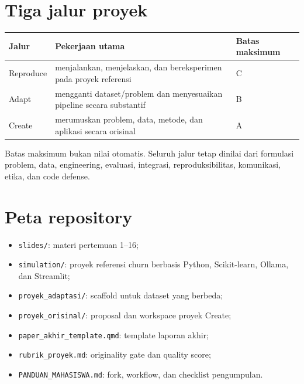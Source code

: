 \documentclass[
  indonesian,
  letterpaper,
  DIV=11,
  numbers=noendperiod]{scrreprt}
\newcounter{none} %
\providecommand{\tightlist}{%
  \setlength{\itemsep}{0pt}\setlength{\parskip}{0pt}}
\begin{document}
\section{Tiga jalur proyek}\label{tiga-jalur-proyek}

{\def\LTcaptype{none} %
\begin{longtable}[]{@{}
  >{\raggedright\arraybackslash}p{}
  >{\raggedright\arraybackslash}p{}
  >{\raggedleft\arraybackslash}p{}@{}}
\toprule\noalign{}
\begin{minipage}[b]{\linewidth}\raggedright
Jalur
\end{minipage} & \begin{minipage}[b]{\linewidth}\raggedright
Pekerjaan utama
\end{minipage} & \begin{minipage}[b]{\linewidth}\raggedleft
Batas maksimum
\end{minipage} \\
\midrule\noalign{}
\endhead
\bottomrule\noalign{}
\endlastfoot
Reproduce & menjalankan, menjelaskan, dan bereksperimen pada proyek
referensi & C \\
Adapt & mengganti dataset/problem dan menyesuaikan pipeline secara
substantif & B \\
Create & merumuskan problem, data, metode, dan aplikasi secara orisinal
& A \\
\end{longtable}
}

Batas maksimum bukan nilai otomatis. Seluruh jalur tetap dinilai dari
formulasi problem, data, engineering, evaluasi, integrasi,
reproduksibilitas, komunikasi, etika, dan code defense.

\section{Peta repository}\label{peta-repository}

\begin{itemize}
\tightlist
\item
  \texttt{slides/}: materi pertemuan 1--16;
\item
  \texttt{simulation/}: proyek referensi churn berbasis Python,
  Scikit-learn, Ollama, dan Streamlit;
\item
  \texttt{proyek\_adaptasi/}: scaffold untuk dataset yang berbeda;
\item
  \texttt{proyek\_orisinal/}: proposal dan workspace proyek Create;
\item
  \texttt{paper\_akhir\_template.qmd}: template laporan akhir;
\item
  \texttt{rubrik\_proyek.md}: originality gate dan quality score;
\item
  \texttt{PANDUAN\_MAHASISWA.md}: fork, workflow, dan checklist
  pengumpulan.
\end{itemize}
\end{document}
